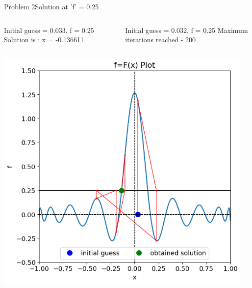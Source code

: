 \documentclass{beamer}
\begin{document}
\begin{frame}{Problem 2}{Solution at 'f' = 0.25}
    \vspace{-2em}
    \begin{columns}
        \begin{block}{\footnotesize Initial guess = 0.033, f = 0.25}
            \footnotesize
            Solution is : x = -0.136611
        \end{block}
        \begin{block}{\footnotesize Initial guess = 0.032, f = 0.25}
            \footnotesize
            Maximum iterations reached - 200
        \end{block}
    \end{columns}
    \vspace{-0.3em}
    \begin{columns}
        \begin{block}{}
            \includegraphics[width=\textwidth]{Figures/prob2_sol21.png}
        \end{block}
        \begin{block}{}

\end{block}
\end{columns}
\end{frame}
\end{document}
